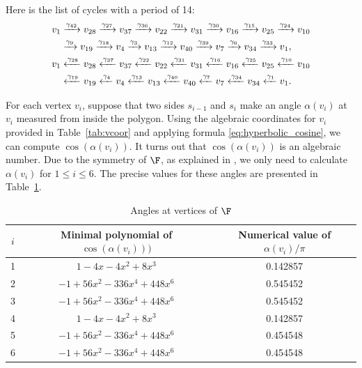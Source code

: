Here is the list of cycles with a period of 14:
\begin{alignat}{2}
v_{1} & \xrightarrow{\gamma_{42}} v_{28} \xrightarrow{\gamma_{27}} v_{37} \xrightarrow{\gamma_{36}} v_{22} \xrightarrow{\gamma_{21}} v_{31} \xrightarrow{\gamma_{30}} v_{16} \xrightarrow{\gamma_{15}} v_{25} \xrightarrow{\gamma_{24}} v_{10} \notag \\
&
\xrightarrow{\gamma_{9}} v_{19}
\xrightarrow{\gamma_{18}} v_{4}
\xrightarrow{\gamma_{3}} v_{13}
\xrightarrow{\gamma_{12}} v_{40} \xrightarrow{\gamma_{39}} v_{7}
\xrightarrow{\gamma_{6}} v_{34}
\xrightarrow{\gamma_{33}} v_{1}, \notag \\
v_{1} &
\xleftarrow{\gamma_{28}} v_{28} 
\xleftarrow{\gamma_{37}} v_{37}
\xleftarrow{\gamma_{22}} v_{22} 
\xleftarrow{\gamma_{31}} v_{31}
\xleftarrow{\gamma_{16}} v_{16}
\xleftarrow{\gamma_{25}} v_{25}
\xleftarrow{\gamma_{10}} v_{10} \notag\\
&
\xleftarrow{\gamma_{19}} v_{19}
\xleftarrow{\gamma_{4}} v_{4} 
\xleftarrow{\gamma_{13}} v_{13}
\xleftarrow{\gamma_{40}} v_{40}
\xleftarrow{\gamma_{7}} v_{7}
\xleftarrow{\gamma_{34}} v_{34}
\xleftarrow{\gamma_{1}} v_{1}.
\label{eq:vertex_cycle2}
\end{alignat}

For each vertex $v_i$, suppose that two sides $s_{i-1}$ and $s_{i}$ make an angle $\alpha(v_i)$ at $v_i$ measured from inside the polygon.
Using the algebraic coordinates for $v_i$ provided in Table~\ref{tab:vcoor} and 
applying formula \eqref{eq:hyperbolic_cosine}, we can compute $\cos(\alpha(v_i))$.
It turns out that $\cos(\alpha(v_i))$ is an algebraic number.
Due to the symmetry of $\F$, as explained in , we only need to calculate $\alpha(v_i)$ for $1\leq i \leq 6$. The precise values for these angles are presented in Table~\ref{tab:vertex_angle}.

\begin{table}[h]
\centering
\begin{tabular}{|c|c|c|}
\hline
$i$ & Minimal polynomial of $\cos(\alpha(v_i)))$ & Numerical value of $\alpha(v_i)/\pi$ \\
\hline
1 & $1-4x-4x^2+8x^3$ & 0.142857 \\
\hline
2 & $-1+56x^2-336x^4+448x^6$ & 0.545452 \\
\hline
3 & $-1+56x^2-336x^4+448x^6$ & 0.545452 \\
\hline
4 & $1-4x-4x^2+8x^3$ & 0.142857 \\
\hline
5 & $-1+56x^2-336x^4+448x^6$ & 0.454548 \\
\hline
6 & $-1+56x^2-336x^4+448x^6$ & 0.454548 \\
\hline
\end{tabular}
\caption{Angles at vertices of $\F$}
\label{tab:vertex_angle}
\end{table}


